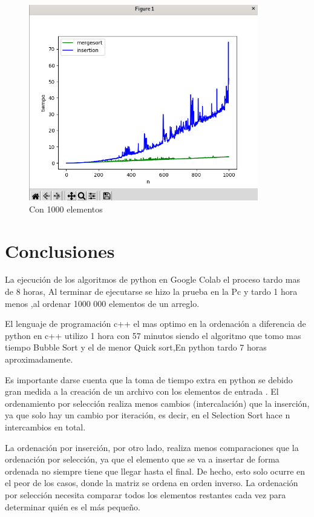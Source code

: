 \documentclass[a4paper]{article}
\begin{document}
\begin{figure}[H]%

\centering
\includegraphics[width=10cm]{imagenes/merge.png}
\caption{Con 1000 elementos}

\end{figure}
\section{Conclusiones}

La ejecución de los algoritmos de python  en Google Colab el proceso tardo mas de 8 horas, Al terminar de ejecutarse se hizo la prueba en la Pc y tardo 1 hora  menos ,al ordenar 1000 000 elementos de un arreglo.

El lenguaje de programación c++ el mas optimo  en la ordenación a diferencia de python en c++ utilizo  1 hora con 57 minutos  siendo el algoritmo que tomo mas tiempo Bubble Sort y el de menor Quick sort,En  python tardo 7 horas aproximadamente.

Es importante darse cuenta  que la toma de tiempo extra en python se debido gran medida a la creación de un archivo con los elementos de entrada . El ordenamiento por  selección realiza menos cambios (intercalación) que la inserción, ya que solo hay un cambio por iteración, es decir, en el Selection Sort   hace n intercambios en total. 

La ordenación por inserción, por otro lado, realiza menos comparaciones que la ordenación por selección, ya que el elemento que se va a insertar de forma ordenada no siempre tiene que llegar hasta el final. De hecho, esto solo ocurre en el peor de los casos, donde la matriz se ordena en orden inverso. La ordenación por selección necesita comparar todos los elementos restantes cada vez para determinar quién es el más pequeño.
\end{document}
